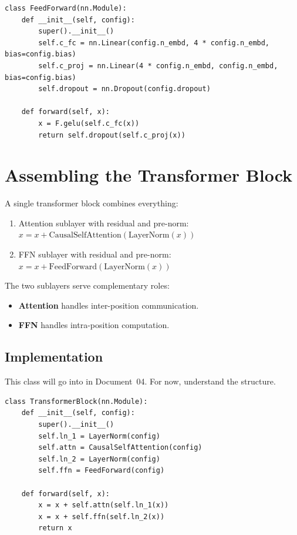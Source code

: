\concepttag
\begin{lstlisting}
class FeedForward(nn.Module):
    def __init__(self, config):
        super().__init__()
        self.c_fc = nn.Linear(config.n_embd, 4 * config.n_embd, bias=config.bias)
        self.c_proj = nn.Linear(4 * config.n_embd, config.n_embd, bias=config.bias)
        self.dropout = nn.Dropout(config.dropout)

    def forward(self, x):
        x = F.gelu(self.c_fc(x))
        return self.dropout(self.c_proj(x))
\end{lstlisting}

\section{Assembling the Transformer Block}

A single transformer block combines everything:

\begin{enumerate}
  \item Attention sublayer with residual and pre-norm: $x = x + \mathrm{CausalSelfAttention}(\mathrm{LayerNorm}(x))$
  \item FFN sublayer with residual and pre-norm: $x = x + \mathrm{FeedForward}(\mathrm{LayerNorm}(x))$
\end{enumerate}

The two sublayers serve complementary roles:
\begin{itemize}
  \item \textbf{Attention} handles inter-position communication.
  \item \textbf{FFN} handles intra-position computation.
\end{itemize}

\subsection{Implementation}

This class will go into  in Document~04. For now, understand the structure.

\concepttag
\begin{lstlisting}
class TransformerBlock(nn.Module):
    def __init__(self, config):
        super().__init__()
        self.ln_1 = LayerNorm(config)
        self.attn = CausalSelfAttention(config)
        self.ln_2 = LayerNorm(config)
        self.ffn = FeedForward(config)

    def forward(self, x):
        x = x + self.attn(self.ln_1(x))
        x = x + self.ffn(self.ln_2(x))
        return x
\end{lstlisting}

